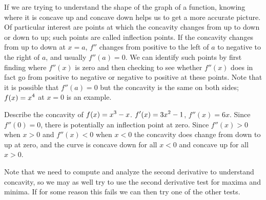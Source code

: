 If we are trying to understand the shape of the graph of a function,
knowing where it is concave up and concave down helps us to get a more
accurate picture. Of particular interest are points at which the
concavity changes from up to down or down to up; such points are
called {\dfont inflection points.} If the
concavity changes from up to down at $x=a$, $f''$ changes from
positive to the left of $a$ to negative to the right of $a$, and
usually $f''(a)=0$. We can identify such points by first finding where
$f''(x)$ is zero and then checking to see whether $f''(x)$ does in
fact go from positive to negative or negative to positive at these
points. Note that it is possible that $f''(a)=0$ but the concavity is
the same on both sides; $\displaystyle f(x)=x^4$ at $x=0$ is an example.

\begin{example}
Describe the concavity of $\displaystyle f(x)=x^3-x$. $\displaystyle f'(x)=3x^2-1$, $f''(x)=6x$.
Since $f''(0)=0$, there is potentially an inflection point at
zero. Since $f''(x)>0$ when $x>0$ and $f''(x)<0$ when $x<0$ the
concavity does change from down to up at zero, and the curve is
concave down for all $x<0$ and concave up for all $x>0$.
\end{example}

Note that we need to compute and analyze the second derivative to
understand concavity, so we may as well try to use the second
derivative test for maxima and minima. If for some reason this fails
we can then try one of the other tests.

